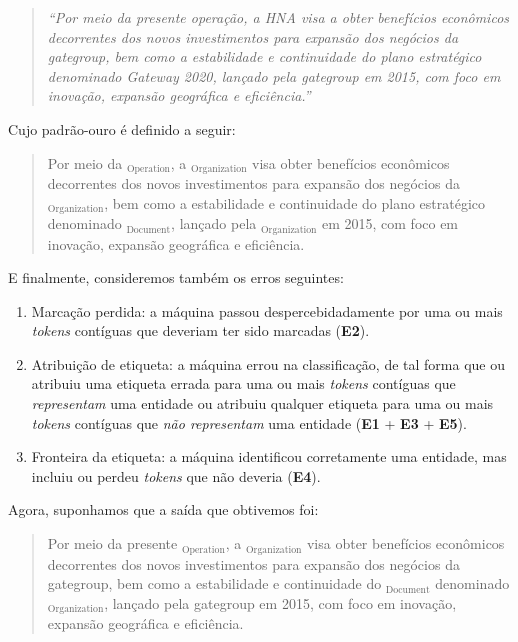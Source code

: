 \documentclass[11pt]{report}
\newcommand{\quotes}[1]{``#1''}
\begin{document}
\begin{quote}
  \textit{\quotes{Por meio da presente operação, a HNA visa a obter benefícios econômicos decorrentes dos novos investimentos para expansão dos negócios da gategroup,
  bem como a  estabilidade e  continuidade do plano estratégico denominado Gateway 2020, lançado pela gategroup em 2015, com foco em inovação, expansão geográfica e eficiência.}}
\end{quote}

\pagebreak Cujo padrão-ouro é definido a seguir:

\begin{quote}
  \begin{varwidth}{0.89\textwidth}
  Por meio da $_{\text{Operation}}$, a $_{\text{Organization}}$ visa obter benefícios econômicos decorrentes dos novos investimentos para
  expansão dos negócios da $_{\text{Organization}}$, bem como a
  estabilidade e  continuidade do plano estratégico denominado $_{\text{Document}}$, lançado pela $_{\text{Organization}}$ em 2015,
  com foco em inovação, expansão geográfica e eficiência.
  \end{varwidth}
\end{quote}

E finalmente, consideremos também os erros seguintes:

\begin{enumerate}[label=\textbf{e\arabic*.}]
  \item Marcação perdida: a máquina passou despercebidadamente por uma ou mais \textit{tokens} contíguas que deveriam ter sido marcadas (\textbf{E2}).
  \item Atribuição de etiqueta: a máquina errou na classificação, de tal forma que ou atribuiu uma etiqueta errada  para uma ou mais \textit{tokens}
  contíguas que \textit{representam} uma entidade ou atribuiu qualquer etiqueta para uma ou mais \textit{tokens} contíguas que \textit{não representam} uma entidade
  (\textbf{E1} + \textbf{E3} + \textbf{E5}).
  \item Fronteira da etiqueta: a máquina identificou corretamente uma entidade, mas incluiu ou perdeu \textit{tokens} que não deveria (\textbf{E4}).
\end{enumerate}

Agora, suponhamos que a saída que obtivemos foi:

\begin{quote}
  \begin{varwidth}{0.89\textwidth}
  Por meio da presente $_{\text{Operation}}$, a $_{\text{Organization}}$ visa obter benefícios econômicos decorrentes dos novos investimentos
  para expansão dos negócios da gategroup,
  bem como a  estabilidade e  continuidade do $_{\text{Document}}$ denominado $_{\text{Organization}}$, lançado pela gategroup
  em 2015, com foco em inovação, expansão geográfica e eficiência.
  \end{varwidth}
\end{quote}
\end{document}
